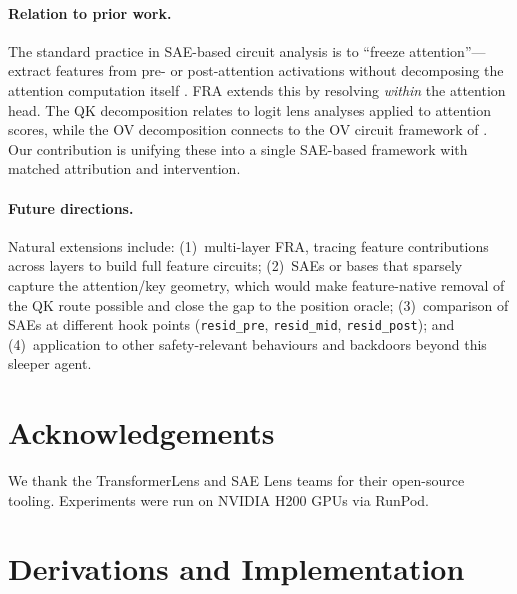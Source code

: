 \documentclass{article}
\theoremstyle{plain}
\theoremstyle{definition}
\theoremstyle{remark}
\begin{document}
\paragraph{Relation to prior work.} The standard practice in SAE-based circuit analysis is to ``freeze attention''---extract features from pre- or post-attention activations without decomposing the attention computation itself \citep{marks2024sparse}. FRA extends this by resolving \emph{within} the attention head. The QK decomposition relates to logit lens analyses \citep{nostalgebraist2020logitlens} applied to attention scores, while the OV decomposition connects to the OV circuit framework of \citet{elhage2021mathematical}. Our contribution is unifying these into a single SAE-based framework with matched attribution and intervention.

\paragraph{Future directions.} Natural extensions include: (1)~multi-layer FRA, tracing feature contributions across layers to build full feature circuits; (2)~SAEs or bases that sparsely capture the attention/key geometry, which would make feature-native removal of the QK route possible and close the gap to the position oracle; (3)~comparison of SAEs at different hook points (\texttt{resid\_pre}, \texttt{resid\_mid}, \texttt{resid\_post}); and (4)~application to other safety-relevant behaviours and backdoors beyond this sleeper agent.


\section*{Acknowledgements}

We thank the TransformerLens and SAE Lens teams for their open-source tooling. Experiments were run on NVIDIA H200 GPUs via RunPod.






\newpage
\appendix
\onecolumn

\section{Derivations and Implementation}
\label{app:derivations}
\end{document}

